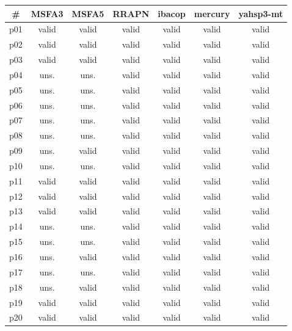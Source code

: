 \begin{tabular}{c||c|c|c|c|c|c}
\textbf{\#} & \textbf{MSFA3} & \textbf{MSFA5} & \textbf{RRAPN} & \textbf{ibacop} & \textbf{mercury} & \textbf{yahsp3-mt}\\
\hline
\hline
p01 & valid & valid & valid & valid & valid & valid\\
p02 & valid & valid & valid & valid & valid & valid\\
p03 & valid & valid & valid & valid & valid & valid\\
p04 & uns. & uns. & valid & valid & valid & valid\\
p05 & uns. & uns. & valid & valid & valid & valid\\
p06 & uns. & uns. & valid & valid & valid & valid\\
p07 & uns. & uns. & valid & valid & valid & valid\\
p08 & uns. & uns. & valid & valid & valid & valid\\
p09 & uns. & valid & valid & valid & valid & valid\\
p10 & uns. & uns. & valid & valid & valid & valid\\
p11 & valid & valid & valid & valid & valid & valid\\
p12 & valid & valid & valid & valid & valid & valid\\
p13 & valid & valid & valid & valid & valid & valid\\
p14 & uns. & uns. & valid & valid & valid & valid\\
p15 & uns. & uns. & valid & valid & valid & valid\\
p16 & uns. & valid & valid & valid & valid & valid\\
p17 & uns. & uns. & valid & valid & valid & valid\\
p18 & uns. & valid & valid & valid & valid & valid\\
p19 & valid & valid & valid & valid & valid & valid\\
p20 & valid & valid & valid & valid & valid & valid\\
\end{tabular}

